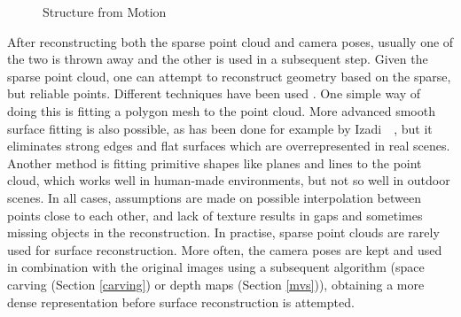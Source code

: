 \begin{figure}[htb!]
 \centering
 \caption{Structure from Motion}
 \label{fig:sfm}
\end{figure}

After reconstructing both the sparse point cloud and camera poses, usually one of the two is thrown away and the other is used in a subsequent step. Given the sparse point cloud, one can attempt to reconstruct geometry based on the sparse, but reliable points. Different techniques have been used \cite{Seitz2006}. One simple way of doing this is fitting a polygon mesh to the point cloud. More advanced smooth surface fitting is also possible, as has been done for example by Izadi~\etal~\cite{Izadi2011}, but it eliminates strong edges and flat surfaces which are overrepresented in real scenes. Another method is fitting primitive shapes like planes and lines to the point cloud, which works well in human-made environments, but not so well in outdoor scenes. In all cases, assumptions are made on possible interpolation between points close to each other, and lack of texture results in gaps and sometimes missing objects in the reconstruction. In practise, sparse point clouds are rarely used for surface reconstruction. More often, the camera poses are kept and used in combination with the original images using a subsequent algorithm (\eg space carving (Section \ref{carving}) or depth maps (Section \ref{mvs})), obtaining a more dense representation before surface reconstruction is attempted.


